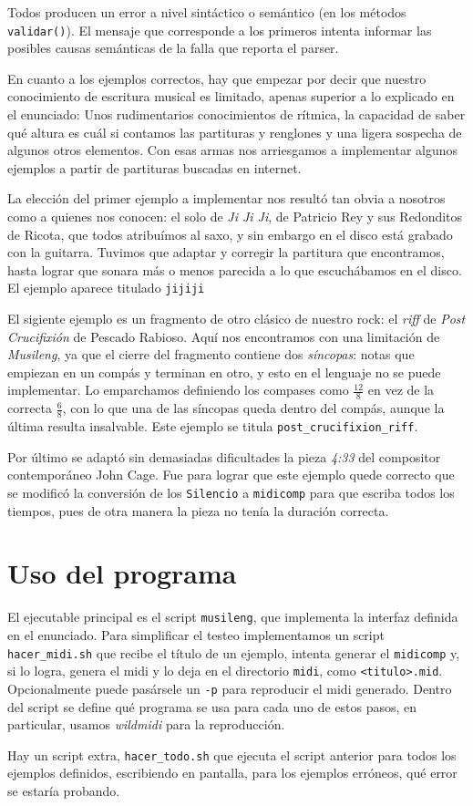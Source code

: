 \documentclass{article}
\begin{document}
Todos producen un error a nivel sintáctico o semántico (en los métodos \texttt{validar()}). El
mensaje que corresponde a los primeros intenta informar las posibles causas semánticas de la falla
que reporta el parser.

En cuanto a los ejemplos correctos, hay que empezar por decir que nuestro conocimiento de escritura
musical es limitado, apenas superior a lo explicado en el enunciado: Unos rudimentarios
conocimientos de rítmica, la capacidad de saber qué altura es cuál si contamos las partituras y
renglones y una ligera sospecha de algunos otros elementos.  Con esas armas nos arriesgamos a
implementar algunos ejemplos a partir de partituras buscadas en internet.

La elección del primer ejemplo a implementar nos resultó tan obvia a nosotros como a quienes nos
conocen: el solo de \emph{Ji Ji Ji}, de Patricio Rey y sus Redonditos de Ricota, que todos atribuímos al
saxo, y sin embargo en el disco está grabado con la guitarra.  Tuvimos que adaptar y corregir la
partitura que encontramos, hasta lograr que sonara más o menos parecida a lo que escuchábamos en el
disco.  El ejemplo aparece titulado \texttt{jijiji}

El sigiente ejemplo es un fragmento de otro clásico de nuestro rock: el \emph{riff} de
\emph{Post Crucifixión} de Pescado Rabioso.  Aquí nos encontramos con una limitación de
\emph{Musileng}, ya que el cierre del fragmento contiene dos \emph{síncopas}: notas que empiezan en
un compás y terminan en otro, y esto en el lenguaje no se puede implementar.  Lo emparchamos
definiendo los compases como $\frac{12}{8}$ en vez de la correcta $\frac{6}{8}$, con lo que una de las
síncopas queda dentro del compás, aunque la última resulta insalvable.  Este ejemplo se titula
\texttt{post\_crucifixion\_riff}.

Por último se adaptó sin demasiadas dificultades la pieza \emph{4:33} del compositor
contemporáneo John Cage.  Fue para lograr que este ejemplo quede correcto que se modificó la
conversión de los \texttt{Silencio} a \texttt{midicomp} para que escriba todos los tiempos, pues de
otra manera la pieza no tenía la duración correcta.

\section*{Uso del programa}
El ejecutable principal es el script \texttt{musileng}, que implementa la interfaz definida en el
enunciado.  Para simplificar el testeo implementamos un script \texttt{hacer\_midi.sh} que recibe el
título de un ejemplo, intenta generar el \texttt{midicomp} y, si lo logra, genera el midi y lo deja
en el directorio \texttt{midi}, como \texttt{<titulo>.mid}.  Opcionalmente puede pasársele un
\texttt{-p} para reproducir el midi generado.  Dentro del script se define qué programa se usa para
cada uno de estos pasos, en particular, usamos \emph{wildmidi} para la reproducción.

Hay un script extra, \texttt{hacer\_todo.sh} que ejecuta el script anterior para todos los ejemplos
definidos, escribiendo en pantalla, para los ejemplos erróneos, qué error se estaría probando.
\end{document}
